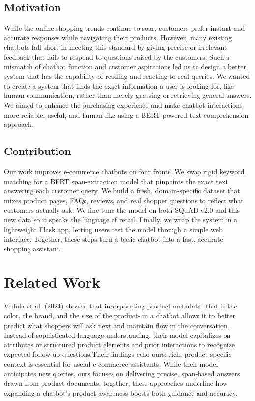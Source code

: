 \documentclass[10pt,conference]{IEEEtran}
\begin{document}
\subsection{\textbf{Motivation}}
While the online shopping trends continue to soar, customers prefer instant and accurate responses while navigating their products. However, many existing chatbots fall short in meeting this standard by giving precise or irrelevant feedback that fails to respond to questions raised by the customers. Such a mismatch of chatbot function and customer aspirations led us to design a better system that has the capability of reading and reacting to real queries. We wanted to create a system that finds the exact information a user is looking for, like human communication, rather than merely guessing or retrieving general answers. We aimed to enhance the purchasing experience and make chatbot interactions more reliable, useful, and human-like using a BERT-powered text comprehension approach.

\subsection{\textbf{Contribution}}
Our work improves e‑commerce chatbots on four fronts. We swap rigid keyword matching for a BERT span‑extraction model that pinpoints the exact text answering each customer query. We build a fresh, domain‑specific dataset that mixes product pages, FAQs, reviews, and real shopper questions to reflect what customers actually ask. We fine‑tune the model on both SQuAD v2.0 and this new data so it speaks the language of retail. Finally, we wrap the system in a lightweight Flask app, letting users test the model through a simple web interface. Together, these steps turn a basic chatbot into a fast, accurate shopping assistant.

\section{\textbf{Related Work}}
Vedula et al. (2024) \cite{1} showed that incorporating product metadata- that is the color, the brand, and the size of the product- in a chatbot allows it to better predict what shoppers will ask next and maintain flow in the conversation. Instead of sophisticated language understanding, their model capitalizes on attributes or structured product elements and prior interactions to recognize expected follow-up questions.Their findings echo ours: rich, product‑specific context is essential for useful e‑commerce assistants. While their model anticipates new queries, ours focuses on delivering precise, span‑based answers drawn from product documents; together, these approaches underline how expanding a chatbot’s product awareness boosts both guidance and accuracy.
\end{document}
